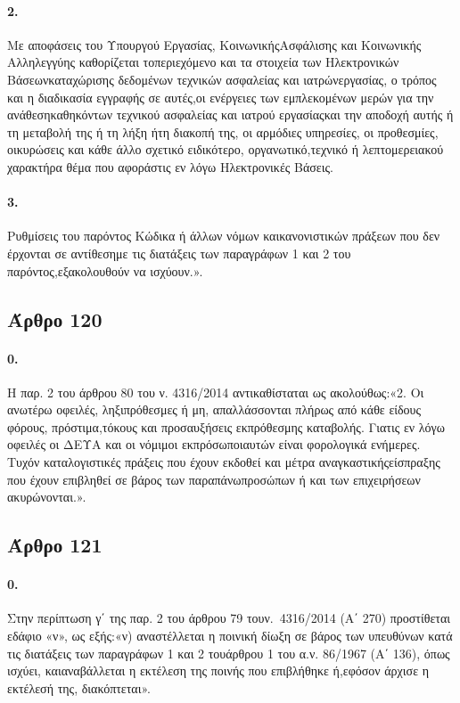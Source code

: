 \documentclass[a4paper,oneside, 10pt]{book}
\begin{document}
\paragraph { 2. } Με αποφάσεις του Υπουργού Εργασίας, ΚοινωνικήςΑσφάλισης και Κοινωνικής Αλληλεγγύης καθορίζεται τοπεριεχόμενο και τα στοιχεία των Ηλεκτρονικών Βάσεωνκαταχώρισης δεδομένων τεχνικών ασφαλείας και ιατρώνεργασίας, ο τρόπος και η διαδικασία εγγραφής σε αυτές,οι ενέργειες των εμπλεκομένων μερών για την ανάθεσηκαθηκόντων τεχνικού ασφαλείας και ιατρού εργασίαςκαι την αποδοχή αυτής ή τη μεταβολή της ή τη λήξη ήτη διακοπή της, οι αρμόδιες υπηρεσίες, οι προθεσμίες, οικυρώσεις και κάθε άλλο σχετικό ειδικότερο, οργανωτικό,τεχνικό ή λεπτομερειακού χαρακτήρα θέμα που αφοράστις εν λόγω Ηλεκτρονικές Βάσεις.
\paragraph { 3. } Ρυθμίσεις του παρόντος Κώδικα ή άλλων νόμων καικανονιστικών πράξεων που δεν έρχονται σε αντίθεσημε τις διατάξεις των παραγράφων 1 και 2 του παρόντος,εξακολουθούν να ισχύουν.».
\subsection*{ Άρθρο 120 }
\paragraph { 0. } Η παρ. 2 του άρθρου 80 του ν. 4316/2014 αντικαθίσταται ως ακολούθως:«2. Οι ανωτέρω οφειλές, ληξιπρόθεσμες ή μη, απαλλάσσονται πλήρως από κάθε είδους φόρους, πρόστιμα,τόκους και προσαυξήσεις εκπρόθεσμης καταβολής. Γιατις εν λόγω οφειλές οι ΔΕΥΑ και οι νόμιμοι εκπρόσωποιαυτών είναι φορολογικά ενήμερες. Τυχόν καταλογιστικές πράξεις που έχουν εκδοθεί και μέτρα αναγκαστικήςείσπραξης που έχουν επιβληθεί σε βάρος των παραπάνωπροσώπων ή και των επιχειρήσεων ακυρώνονται.».
\subsection*{ Άρθρο 121 }
\paragraph { 0. } Στην περίπτωση γ΄ της παρ. 2 του άρθρου 79 τουν. 4316/2014 (Α΄ 270) προστίθεται εδάφιο «ν», ως εξής:«ν) αναστέλλεται η ποινική δίωξη σε βάρος των υπευθύνων κατά τις διατάξεις των παραγράφων 1 και 2 τουάρθρου 1 του α.ν. 86/1967 (Α΄ 136), όπως ισχύει, καιαναβάλλεται η εκτέλεση της ποινής που επιβλήθηκε ή,εφόσον άρχισε η εκτέλεσή της, διακόπτεται».
\end{document}

